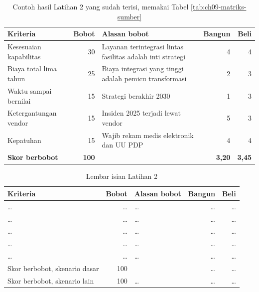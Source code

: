 \begin{table}[!htb]
  \centering
  \caption{Contoh hasil Latihan 2 yang sudah terisi, memakai Tabel
           \ref{tab:ch09-matriks-sumber}}
  \label{tab:ch09-lat2-contoh}
  \small
  \begin{tabularx}{\textwidth}{lrXrr}
    \hline
    \textbf{Kriteria} & \textbf{Bobot} & \textbf{Alasan bobot} & \textbf{Bangun} & \textbf{Beli} \\
    \hline
    Kesesuaian kapabilitas & 30 & Layanan terintegrasi lintas fasilitas adalah inti strategi & 4 & 4 \\
    \hline
    Biaya total lima tahun & 25 & Biaya integrasi yang tinggi adalah pemicu transformasi & 2 & 3 \\
    \hline
    Waktu sampai bernilai & 15 & Strategi berakhir 2030 & 1 & 3 \\
    \hline
    Ketergantungan vendor & 15 & Insiden 2025 terjadi lewat vendor & 5 & 3 \\
    \hline
    Kepatuhan & 15 & Wajib rekam medis elektronik dan UU PDP & 4 & 4 \\
    \hline
    \textbf{Skor berbobot} & \textbf{100} & & \textbf{3,20} & \textbf{3,45} \\
    \hline
  \end{tabularx}
\end{table}

\begin{table}[!htb]
  \centering
  \caption{Lembar isian Latihan 2}
  \label{tab:ch09-lat2-hasil}
  \small
  \begin{tabularx}{\textwidth}{lrXrr}
    \hline
    \textbf{Kriteria} & \textbf{Bobot} & \textbf{Alasan bobot} & \textbf{Bangun} & \textbf{Beli} \\
    \hline
    \dots & \dots & \dots & \dots & \dots \\
    \hline
    \dots & \dots & \dots & \dots & \dots \\
    \hline
    \dots & \dots & \dots & \dots & \dots \\
    \hline
    \dots & \dots & \dots & \dots & \dots \\
    \hline
    \dots & \dots & \dots & \dots & \dots \\
    \hline
    Skor berbobot, skenario dasar & 100 & & \dots & \dots \\
    \hline
    Skor berbobot, skenario lain & 100 & \dots & \dots & \dots \\
    \hline
  \end{tabularx}
\end{table}

